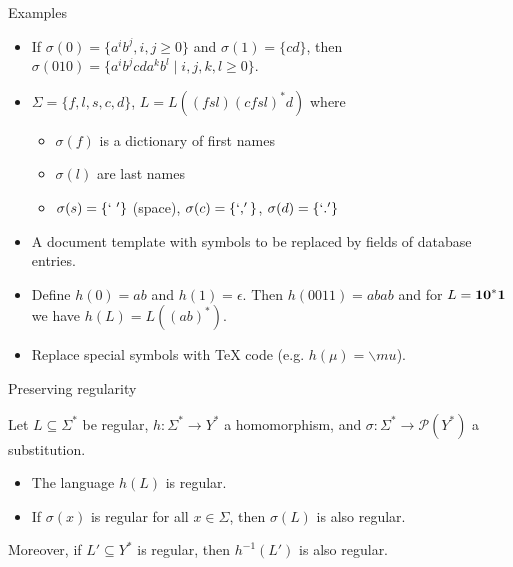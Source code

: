 \documentclass[handout]{beamer}
\begin{document}
\begin{frame}{Examples}

    \begin{example}[Substitution]        
        \begin{itemize}
            \item If $\sigma(0)=\{a^ib^j, i,j\geq 0\}$ and $\sigma(1)=\{cd\}$, then $\sigma(010)=\{a^ib^jcda^kb^l\mid i,j,k,l\geq 0\}$.
            \item $\Sigma=\{f,l,s,c,d\}$, $L=L((fsl)(cfsl)^*d)$ where         
            \begin{itemize}
                \item $\sigma(f)$ is a dictionary of first names
                \item $\sigma(l)$ are last names
                \item $\sigma(s)=\{`\ '\}$ (space), $\sigma(c)=\{`,'\}$, $\sigma(d)=\{`.'\}$
            \end{itemize}
            \item A document template with symbols to be replaced by fields of database entries.            
        \end{itemize}
    \end{example}

    \begin{example}[Homomorphism]        
        \begin{itemize}
            \item Define $h(0)=ab$ and $h(1)=\epsilon$. Then $h(0011)=abab$ and for $L={\bf 10}^*{\bf 1}$ we have $h(L)=L((ab)^*)$.
            \item Replace special symbols with {\TeX} code (e.g. $h(\mu)=\backslash mu$).            
        \end{itemize}
    \end{example}  

\end{frame}


\begin{frame}{Preserving regularity}

    \begin{theorem}
        Let $L\subseteq\Sigma^*$ be regular, $h\colon\Sigma^*\rightarrow Y^*$ a homomorphism, and $\sigma\colon \Sigma^*\rightarrow \mathcal P(Y^*)$ a substitution.
        \begin{itemize}
            \item The language $h(L)$ is regular.
            \item If $\sigma(x)$ is regular for all $x\in\Sigma$, then $\sigma(L)$ is also regular.
        \end{itemize}
        Moreover, if $L'\subseteq Y^*$ is regular, then $h^{-1}(L')$ is also regular.
    \end{theorem}

\end{frame}
\end{document}
